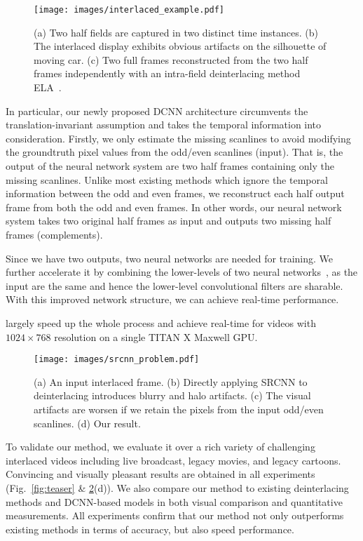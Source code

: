 \documentclass[acmtog]{acmart}
\begin{document}
\begin{figure}[!tp]	
	\texttt{[image: images/interlaced\_example.pdf]}\\
	\caption{(a) Two half fields are captured in two distinct time instances. 
	(b) The interlaced display exhibits obvious artifacts on the silhouette of moving car.
	(c) Two full frames	reconstructed from the two half frames independently with an intra-field deinterlacing method ELA~\cite{doyle1990interlaced}.} \label{fig:interlaced_example}
\end{figure}



In particular, our newly proposed DCNN architecture circumvents the translation-invariant assumption and takes the temporal
information into consideration. Firstly, we only estimate the missing scanlines
to avoid modifying the groundtruth pixel values from the odd/even scanlines
(input). That is, the output of the neural network system are two half frames
containing only the missing scanlines. Unlike most existing methods which ignore the
temporal information between the odd and even frames, we reconstruct each half 
output frame from both the odd and even frames. In other words,
 our
neural network system takes two original half frames as input and outputs two missing half
frames (complements). 

Since we have two outputs, two neural networks are needed for training. 
We further accelerate it by combining the lower-levels of two
neural networks~\cite{bengio2012deep}, as the input are the same and 
hence the lower-level convolutional filters are sharable. 
With this improved network structure, we can achieve real-time performance.

largely speed up the whole process and achieve real-time for videos with
$1024\times768$ resolution on a single TITAN X Maxwell GPU. 
\fi 

\begin{figure}[!tp]
\texttt{[image: images/srcnn\_problem.pdf]}\\
\caption{(a) An input interlaced frame. 
(b) Directly applying SRCNN to deinterlacing introduces blurry and halo artifacts. 
(c) The visual artifacts are worsen if we retain the pixels from the input odd/even scanlines. 
(d) Our result.}\label{fig:srcnn_problem} 
\end{figure}

To validate our method, we evaluate it over a rich
variety of challenging interlaced videos including live broadcast, legacy movies,
and legacy cartoons. Convincing and visually pleasant results are obtained in all experiments 
(Fig.~\ref{fig:teaser} \& \ref{fig:srcnn_problem}(d)). We also compare our
method to existing deinterlacing methods and DCNN-based models in both visual comparison and quantitative
measurements. All experiments confirm that our method not
only outperforms existing methods in terms of accuracy, but also
speed performance. 
\end{document}
